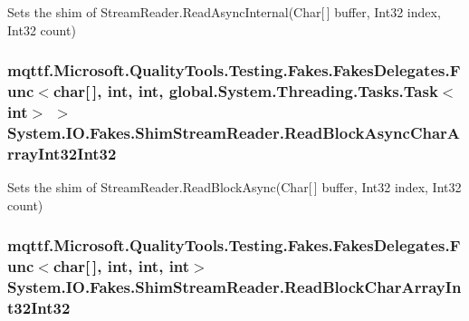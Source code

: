 Sets the shim of Stream\-Reader.\-Read\-Async\-Internal(\-Char\mbox{[}$\,$\mbox{]} buffer, Int32 index, Int32 count)

\hypertarget{class_system_1_1_i_o_1_1_fakes_1_1_shim_stream_reader_a238e61258cbe225f53c4c9f9249385ad}{
\subsubsection[{Read\-Block\-Async\-Char\-Array\-Int32\-Int32}]{\setlength{\rightskip}{0pt plus 5cm}mqttf.\-Microsoft.\-Quality\-Tools.\-Testing.\-Fakes.\-Fakes\-Delegates.\-Func$<$char\mbox{[}$\,$\mbox{]}, int, int, global.\-System.\-Threading.\-Tasks.\-Task$<$int$>$ $>$ System.\-I\-O.\-Fakes.\-Shim\-Stream\-Reader.\-Read\-Block\-Async\-Char\-Array\-Int32\-Int32\hspace{0.3cm}{\ttfamily [set]}}}\label{class_system_1_1_i_o_1_1_fakes_1_1_shim_stream_reader_a238e61258cbe225f53c4c9f9249385ad}


Sets the shim of Stream\-Reader.\-Read\-Block\-Async(\-Char\mbox{[}$\,$\mbox{]} buffer, Int32 index, Int32 count)

\hypertarget{class_system_1_1_i_o_1_1_fakes_1_1_shim_stream_reader_af3d6c970b696de454a6cd7bd5949cff2}{
\subsubsection[{Read\-Block\-Char\-Array\-Int32\-Int32}]{\setlength{\rightskip}{0pt plus 5cm}mqttf.\-Microsoft.\-Quality\-Tools.\-Testing.\-Fakes.\-Fakes\-Delegates.\-Func$<$char\mbox{[}$\,$\mbox{]}, int, int, int$>$ System.\-I\-O.\-Fakes.\-Shim\-Stream\-Reader.\-Read\-Block\-Char\-Array\-Int32\-Int32\hspace{0.3cm}{\ttfamily [set]}}}\label{class_system_1_1_i_o_1_1_fakes_1_1_shim_stream_reader_af3d6c970b696de454a6cd7bd5949cff2}


